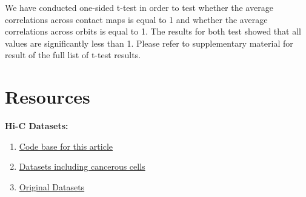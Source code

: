 \documentclass[a4,center,fleqn]{NAR}
\begin{document}
We have conducted one-sided
t-test in order to test whether the average correlations across
contact maps is equal to 1  and whether the average 
correlations across orbits is equal to 1. The results
for both test showed that all values are significantly less than 1.
Please refer to supplementary material for result of the 
full list of t-test results.
\begin{table}[]
    \centering
    \caption{}
    \label{tab:t-test}
\end{table}
\newpage
\section{Resources}
\textbf{Hi-C Datasets:}
\begin{enumerate}
    \item \href{https://github.com/rasoolianbehnam/watson}{Code base for this article}
    \item \href{http://sysbio.rnet.missouri.edu/T0510/tmp_download/link_to_download_genome_data/}
        {Datasets including cancerous cells}
    \item \href{https://bcm.app.box.com/v/aidenlab/folder/11234760671}{Original Datasets}
\end{enumerate}
\end{document}
